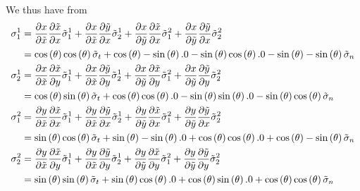 We thus have from 
\begin{equation}
  \begin{aligned}
     \sigma ^{1}_{1}&=
     \dfrac{\partial x}{\partial \tilde{x}}  \dfrac{\partial \tilde{x}}{\partial x} \tilde{ \sigma }^{1}_{1}
    + \dfrac{\partial x}{\partial \tilde{x}}  \dfrac{\partial \tilde{y}}{\partial x} \tilde{ \sigma }^{1}_{2}
    + \dfrac{\partial x}{\partial \tilde{y}}  \dfrac{\partial \tilde{x}}{\partial x} \tilde{ \sigma }^{2}_{1}
    + \dfrac{\partial x}{\partial \tilde{y}}  \dfrac{\partial \tilde{y}}{\partial x} \tilde{ \sigma }^{2}_{2} \\
    &=  \cos\left( \theta \right)    \cos\left( \theta \right)  \tilde{ \sigma }_{t}
    +  \cos\left( \theta \right)  -  \sin\left( \theta \right)  .0
    -  \sin\left( \theta \right)    \cos\left( \theta \right)  .0
    -  \sin\left( \theta \right)  -  \sin\left( \theta \right)  \tilde{ \sigma }_{n} \\
     \sigma ^{1}_{2}&=
     \dfrac{\partial x}{\partial \tilde{x}}  \dfrac{\partial \tilde{x}}{\partial y} \tilde{ \sigma }^{1}_{1}
    + \dfrac{\partial x}{\partial \tilde{x}}  \dfrac{\partial \tilde{y}}{\partial y} \tilde{ \sigma }^{1}_{2}
    + \dfrac{\partial x}{\partial \tilde{y}}  \dfrac{\partial \tilde{x}}{\partial y} \tilde{ \sigma }^{2}_{1}
    + \dfrac{\partial x}{\partial \tilde{y}}  \dfrac{\partial \tilde{y}}{\partial y} \tilde{ \sigma }^{2}_{2} \\
    &=  \cos\left( \theta \right)    \sin\left( \theta \right)  \tilde{ \sigma }_{t}
    +  \cos\left( \theta \right)    \cos\left( \theta \right)  .0
    -  \sin\left( \theta \right)    \sin\left( \theta \right)  .0
    -  \sin\left( \theta \right)    \cos\left( \theta \right)  \tilde{ \sigma }_{n} \\
     \sigma ^{2}_{1}&=
     \dfrac{\partial y}{\partial \tilde{x}}  \dfrac{\partial \tilde{x}}{\partial x} \tilde{ \sigma }^{1}_{1}
    + \dfrac{\partial y}{\partial \tilde{x}}  \dfrac{\partial \tilde{y}}{\partial x} \tilde{ \sigma }^{1}_{2}
    + \dfrac{\partial y}{\partial \tilde{y}}  \dfrac{\partial \tilde{x}}{\partial x} \tilde{ \sigma }^{2}_{1}
    + \dfrac{\partial y}{\partial \tilde{y}}  \dfrac{\partial \tilde{y}}{\partial x} \tilde{ \sigma }^{2}_{2} \\
    &=  \sin\left( \theta \right)    \cos\left( \theta \right)  \tilde{ \sigma }_{t}
    +  \sin\left( \theta \right)  -  \sin\left( \theta \right)  .0
    +  \cos\left( \theta \right)    \cos\left( \theta \right)  .0
    +  \cos\left( \theta \right)  -  \sin\left( \theta \right)  \tilde{ \sigma }_{n} \\
     \sigma ^{2}_{2}&=
     \dfrac{\partial y}{\partial \tilde{x}}  \dfrac{\partial \tilde{x}}{\partial y} \tilde{ \sigma }^{1}_{1}
    + \dfrac{\partial y}{\partial \tilde{x}}  \dfrac{\partial \tilde{y}}{\partial y} \tilde{ \sigma }^{1}_{2}
    + \dfrac{\partial y}{\partial \tilde{y}}  \dfrac{\partial \tilde{x}}{\partial y} \tilde{ \sigma }^{2}_{1}
    + \dfrac{\partial y}{\partial \tilde{y}}  \dfrac{\partial \tilde{y}}{\partial y} \tilde{ \sigma }^{2}_{2} \\
    &=  \sin\left( \theta \right)    \sin\left( \theta \right)  \tilde{ \sigma }_{t}
    +  \sin\left( \theta \right)    \cos\left( \theta \right)  .0
    +  \cos\left( \theta \right)    \sin\left( \theta \right)  .0
    +  \cos\left( \theta \right)    \cos\left( \theta \right)  \tilde{ \sigma }_{n} \\
  \end{aligned}
\end{equation}


